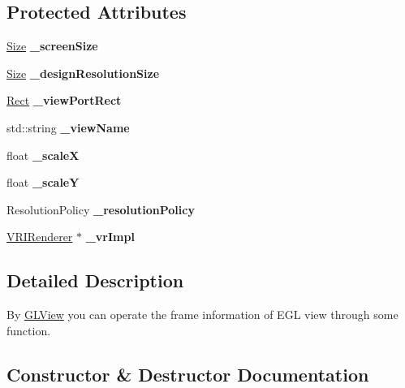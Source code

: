 \subsection*{Protected Attributes}
\begin{DoxyCompactItemize}
\item 
\mbox{\label{classGLView_a44ff126272d7ef211b4ee1134f5a8b69}} 
\hyperlink{classSize}{Size} {\bfseries \+\_\+screen\+Size}
\item 
\mbox{\label{classGLView_af3b66e79d96ded0a884994188a47cbbf}} 
\hyperlink{classSize}{Size} {\bfseries \+\_\+design\+Resolution\+Size}
\item 
\mbox{\label{classGLView_a484a07cc99a77fb82614311bfb83ea9d}} 
\hyperlink{classRect}{Rect} {\bfseries \+\_\+view\+Port\+Rect}
\item 
\mbox{\label{classGLView_a21aadd869607f7d86ea0069ec4f843bf}} 
std\+::string {\bfseries \+\_\+view\+Name}
\item 
\mbox{\label{classGLView_ae1ff2e0375d9bafac4048999ce0ec423}} 
float {\bfseries \+\_\+scaleX}
\item 
\mbox{\label{classGLView_a01511f8f12b53aa831d1289c32edc02f}} 
float {\bfseries \+\_\+scaleY}
\item 
\mbox{\label{classGLView_a5f156c4708a83978ed7422f027ed1259}} 
Resolution\+Policy {\bfseries \+\_\+resolution\+Policy}
\item 
\mbox{\label{classGLView_a0c5ef38c6008ce8bfee04c35a6f71317}} 
\hyperlink{classVRIRenderer}{V\+R\+I\+Renderer} $\ast$ {\bfseries \+\_\+vr\+Impl}
\end{DoxyCompactItemize}


\subsection{Detailed Description}
By \hyperlink{classGLView}{G\+L\+View} you can operate the frame information of E\+GL view through some function. 

\subsection{Constructor \& Destructor Documentation}
\mbox{\label{classGLView_a33f41548b6b0256c886ce75edf8015ce}} 
